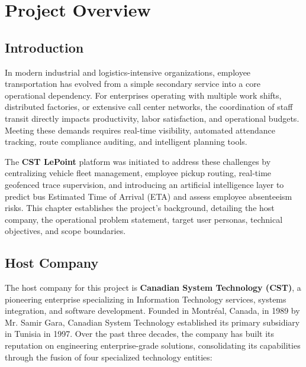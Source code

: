 \chapter{Project Overview}
\label{chap:project_overview}

\section{Introduction}

In modern industrial and logistics-intensive organizations, employee transportation has evolved from a simple secondary service into a core operational dependency. For enterprises operating with multiple work shifts, distributed factories, or extensive call center networks, the coordination of staff transit directly impacts productivity, labor satisfaction, and operational budgets. Meeting these demands requires real-time visibility, automated attendance tracking, route compliance auditing, and intelligent planning tools.

The \textbf{CST LePoint} platform was initiated to address these challenges by centralizing vehicle fleet management, employee pickup routing, real-time geofenced trace supervision, and introducing an artificial intelligence layer to predict bus Estimated Time of Arrival (ETA) and assess employee absenteeism risks. This chapter establishes the project's background, detailing the host company, the operational problem statement, target user personas, technical objectives, and scope boundaries.

\newpage
\section{Host Company}

The host company for this project is \textbf{Canadian System Technology (CST)}, a pioneering enterprise specializing in Information Technology services, systems integration, and software development. Founded in Montréal, Canada, in 1989 by Mr. Samir Gara, Canadian System Technology established its primary subsidiary in Tunisia in 1997. Over the past three decades, the company has built its reputation on engineering enterprise-grade solutions, consolidating its capabilities through the fusion of four specialized technology entities:


